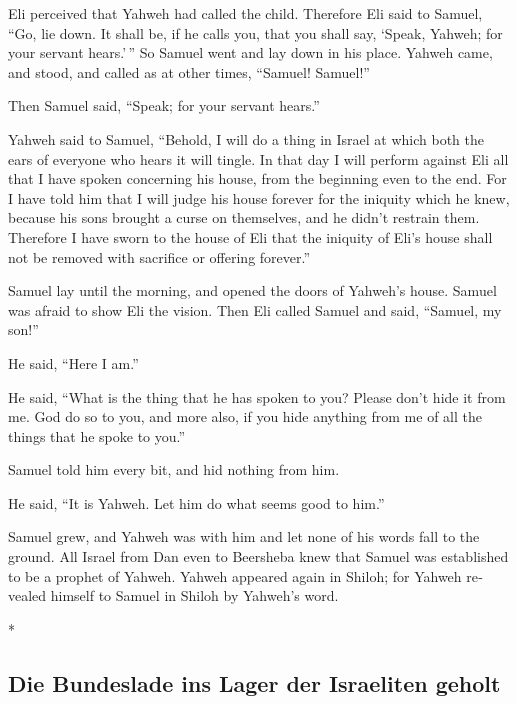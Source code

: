 \begin{paracol}{2}
\begin{otherlanguage}{english}
Eli perceived that Yahweh had called the child.  Therefore
Eli said to Samuel, ``Go, lie down. It shall be, if he calls you, that
you shall say, `Speak, Yahweh; for your servant hears.'\,'' So Samuel
went and lay down in his place.  Yahweh came, and stood,
and called as at other times, ``Samuel! Samuel!''

Then Samuel said, ``Speak; for your servant hears.''

 Yahweh said to Samuel, ``Behold, I will do a thing in
Israel at which both the ears of everyone who hears it will tingle.
 In that day I will perform against Eli all that I have
spoken concerning his house, from the beginning even to the end.
 For I have told him that I will judge his house forever
for the iniquity which he knew, because his sons brought a curse on
themselves, and he didn't restrain them.  Therefore I
have sworn to the house of Eli that the iniquity of Eli's house shall
not be removed with sacrifice or offering forever.''

 Samuel lay until the morning, and opened the doors of
Yahweh's house. Samuel was afraid to show Eli the vision.
 Then Eli called Samuel and said, ``Samuel, my son!''

He said, ``Here I am.''

 He said, ``What is the thing that he has spoken to you?
Please don't hide it from me. God do so to you, and more also, if you
hide anything from me of all the things that he spoke to you.''

 Samuel told him every bit, and hid nothing from him.

He said, ``It is Yahweh. Let him do what seems good to him.''

 Samuel grew, and Yahweh was with him and let none of his
words fall to the ground.  All Israel from Dan even to
Beersheba knew that Samuel was established to be a prophet of Yahweh.
 Yahweh appeared again in Shiloh; for Yahweh revealed
himself to Samuel in Shiloh by Yahweh's word.

\end{otherlanguage}

\switchcolumn[0]*

\hypertarget{die-bundeslade-ins-lager-der-israeliten-geholt}{%
\subsection{Die Bundeslade ins Lager der Israeliten
geholt}\label{die-bundeslade-ins-lager-der-israeliten-geholt}}


\end{paracol}
